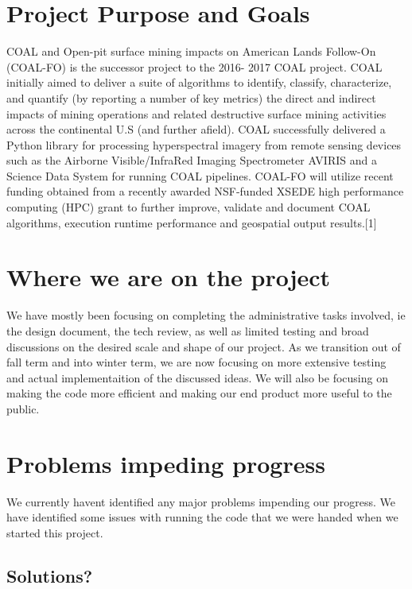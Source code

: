 \documentclass[onecolumn, draftclsnofoot,10pt, compsoc]{IEEEtran}
\begin{document}
\section{Project Purpose and Goals}

COAL and Open-pit surface mining impacts on American Lands Follow-On (COAL-FO) is the successor project to
the 2016- 2017 COAL project. COAL initially aimed to deliver a suite of algorithms to identify, classify, characterize,
and quantify (by reporting a number of key metrics) the direct and indirect impacts of mining operations and related
destructive surface mining activities across the continental U.S (and further afield). COAL successfully delivered a
Python library for processing hyperspectral imagery from remote sensing devices such as the Airborne Visible/InfraRed
Imaging Spectrometer AVIRIS and a Science Data System for running COAL pipelines. COAL-FO will utilize recent
funding obtained from a recently awarded NSF-funded XSEDE high performance computing (HPC) grant to further
improve, validate and document COAL algorithms, execution runtime performance and geospatial output results.[1]

\section{Where we are on the project}

We have mostly been focusing on completing the administrative tasks involved, ie the design document, the tech review, as well as limited testing and broad discussions on the desired scale and shape of our project. As we transition out of fall term and into winter term, we are now focusing on more extensive testing and actual implementaition of the discussed ideas. We will also be focusing on making the code more efficient and making our end product more useful to the public.

\section{Problems impeding progress}

We currently havent identified any major problems impending our progress. We have identified some issues with running the code that we were handed when we started this project.

\subsection{Solutions?}
\end{document}
